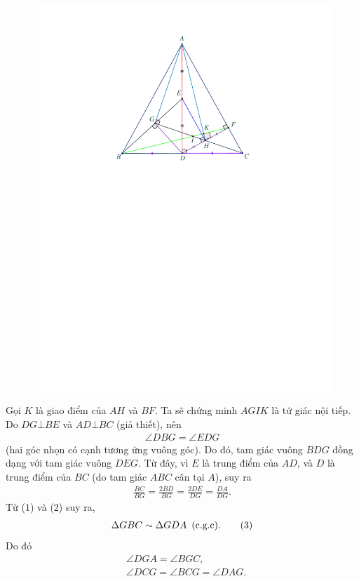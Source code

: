 \begin{multicols}{2}
\begin{figure}[H]
		\includegraphics[width= 0.85\linewidth]{P605}
		\vspace*{-10pt}
	\end{figure}
	Gọi $K$ là giao điểm của $AH$ và $BF$. Ta sẽ chứng minh $AGIK$ là tứ giác nội tiếp.
	\vskip 0.05cm
	Do $DG \bot BE$ và $AD \bot BC$ (giả thiết), nên
	\begin{align*}
		\angle DBG = \angle EDG\tag{$1$}
	\end{align*}
	(hai góc nhọn có cạnh tương ứng vuông góc).
	\vskip 0.05cm
	Do đó, tam giác vuông $BDG$ đồng dạng với tam giác vuông $DEG$. Từ đây, vì $E$ là trung điểm của $AD$, và $D$ là trung điểm của $BC$ (do tam giác $ABC$ cân tại $A$), suy ra
	\begin{align*}
		\frac{{BC}}{{BG}} = \frac{{2BD}}{{BG}} = \frac{{2DE}}{{DG}} = \frac{{DA}}{{DG}}. \tag{$2$}
	\end{align*}
	Từ ($1$) và ($2$) suy ra,
	\begin{align*}
		\Delta GBC \sim \Delta GDA \,\,\,\text{\color{black}(c.g.c)}. \tag{$3$}
	\end{align*}
	Do đó
	\begin{align*}
		&\angle DGA = \angle BGC, \tag{$4$}\\
		&\angle DCG = \angle BCG = \angle DAG.\tag{$5$}

\end{align*}
\end{multicols}
